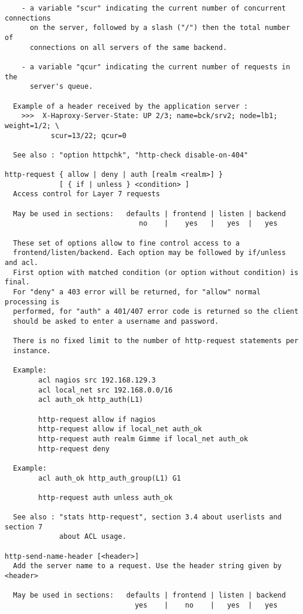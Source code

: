 \begin{verbatim}
    - a variable "scur" indicating the current number of concurrent connections
      on the server, followed by a slash ("/") then the total number of
      connections on all servers of the same backend.

    - a variable "qcur" indicating the current number of requests in the
      server's queue.

  Example of a header received by the application server :
    >>>  X-Haproxy-Server-State: UP 2/3; name=bck/srv2; node=lb1; weight=1/2; \
           scur=13/22; qcur=0

  See also : "option httpchk", "http-check disable-on-404"

http-request { allow | deny | auth [realm <realm>] }
             [ { if | unless } <condition> ]
  Access control for Layer 7 requests

  May be used in sections:   defaults | frontend | listen | backend
                                no    |    yes   |   yes  |   yes

  These set of options allow to fine control access to a
  frontend/listen/backend. Each option may be followed by if/unless and acl.
  First option with matched condition (or option without condition) is final.
  For "deny" a 403 error will be returned, for "allow" normal processing is
  performed, for "auth" a 401/407 error code is returned so the client
  should be asked to enter a username and password.

  There is no fixed limit to the number of http-request statements per
  instance.

  Example:
        acl nagios src 192.168.129.3
        acl local_net src 192.168.0.0/16
        acl auth_ok http_auth(L1)

        http-request allow if nagios
        http-request allow if local_net auth_ok
        http-request auth realm Gimme if local_net auth_ok
        http-request deny

  Example:
        acl auth_ok http_auth_group(L1) G1

        http-request auth unless auth_ok

  See also : "stats http-request", section 3.4 about userlists and section 7
             about ACL usage.

http-send-name-header [<header>]
  Add the server name to a request. Use the header string given by <header>

  May be used in sections:   defaults | frontend | listen | backend
                               yes    |    no    |   yes  |   yes


\end{verbatim}
